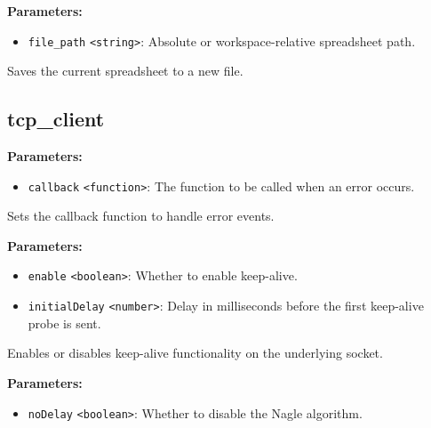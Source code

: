 \documentclass[12pt,a4paper]{article}
\begin{document}
\noindent \textbf{Parameters:}
\begin{itemize}
  \item \texttt{file\_path} \texttt{<string>}: Absolute or workspace-relative spreadsheet path.
\end{itemize}

\noindent Saves the current spreadsheet to a new file.


\subsection{tcp\_client}
\vspace{5mm}
\noindent {}


\noindent \textbf{Parameters:}
\begin{itemize}
  \item \texttt{callback} \texttt{<function>}: The function to be called when an error occurs.
\end{itemize}

\noindent Sets the callback function to handle error events.

\vspace{5mm}
\noindent {}


\noindent \textbf{Parameters:}
\begin{itemize}
  \item \texttt{enable} \texttt{<boolean>}: Whether to enable keep-alive.
  \item \texttt{initialDelay} \texttt{<number>}: Delay in milliseconds before the first keep-alive probe is sent.
\end{itemize}

\noindent Enables or disables keep-alive functionality on the underlying socket.

\vspace{5mm}
\noindent {}


\noindent \textbf{Parameters:}
\begin{itemize}
  \item \texttt{noDelay} \texttt{<boolean>}: Whether to disable the Nagle algorithm.
\end{itemize}
\end{document}
